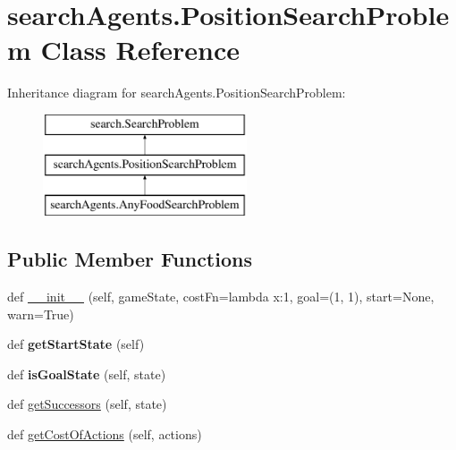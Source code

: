 \hypertarget{classsearch_agents_1_1_position_search_problem}{}\section{search\+Agents.\+Position\+Search\+Problem Class Reference}
\label{classsearch_agents_1_1_position_search_problem}
Inheritance diagram for search\+Agents.\+Position\+Search\+Problem\+:\begin{figure}[H]
\begin{center}
\leavevmode
\includegraphics[height=3.000000cm]{classsearch_agents_1_1_position_search_problem}
\end{center}
\end{figure}
\subsection*{Public Member Functions}
\begin{DoxyCompactItemize}
\item 
def \hyperlink{classsearch_agents_1_1_position_search_problem_a59e8c9a64a7b1f994e127f76587145bf}{\+\_\+\+\_\+init\+\_\+\+\_\+} (self, game\+State, cost\+Fn=lambda x\+:1, goal=(1, 1), start=None, warn=True)
\item 
\mbox{\label{classsearch_agents_1_1_position_search_problem_a1aacdbd2e27dcc7d1827e9a739c7a67e}} 
def {\bfseries get\+Start\+State} (self)
\item 
\mbox{\label{classsearch_agents_1_1_position_search_problem_abca1168f57dfce26905c037794c483fe}} 
def {\bfseries is\+Goal\+State} (self, state)
\item 
def \hyperlink{classsearch_agents_1_1_position_search_problem_a0bdc0dc758b100e61188e2335b763fbf}{get\+Successors} (self, state)
\item 
def \hyperlink{classsearch_agents_1_1_position_search_problem_a31ea791f51f365a42ad8a0030b3a3c5f}{get\+Cost\+Of\+Actions} (self, actions)
\end{DoxyCompactItemize}
